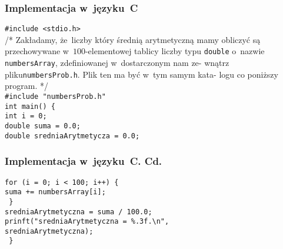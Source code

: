 \documentclass[10pt,t]{beamer}
\begin{document}
\begin{frame}
  \frametitle{Implementacja w~języku~C}


  \texttt{\#include <stdio.h>} \\
  \vspace{0.8em}
  /* Zakładamy, że~liczby który średnią arytmetyczną mamy obliczyć są
  przechowywane w~$100$-elementowej tablicy liczby typu \texttt{double}
  \hphantom{aa} o~nazwie \texttt{numbersArray}, zdefiniowanej
  w~dostarczonym nam ze-
  \hphantom{aa} wnątrz pliku\texttt{numbersProb.h}. Plik ten ma być w~tym
  samym kata-
  \hphantom{aa} logu co poniższy program. */ \\
  \texttt{\#include "numbersProb.h"} \\
  \vspace{0.8em}
  \texttt{int main() \{ } \\
  \hphantom{aaaa} \texttt{int i = 0;} \\
  \hphantom{aaaa} \texttt{double suma = 0.0;} \\
  \hphantom{aaaa} \texttt{double sredniaArytmetycza = 0.0;}

\end{frame}





\begin{frame}
  \frametitle{Implementacja w~języku~C. Cd.}


  \hphantom{aaaa} \texttt{for (i = 0; i < 100; i++) \{ } \\
  \hphantom{aaaaaaaa} \texttt{suma += numbersArray[i];} \\
  \hphantom{aaaa} \texttt{ \} } \\
  \vspace{0.8em}
  \hphantom{aaaa} \texttt{sredniaArytmetyczna = suma / 100.0;} \\
  \vspace{0.8em}
  \hphantom{aaaa} \texttt{prinft("sredniaArytmetyczna =
    \%.3f.\textbackslash n", \\
    \hphantom{aaaaaaaaa} sredniaArytmetyczna);} \\
  \texttt{ \} }

\end{frame}
\end{document}
